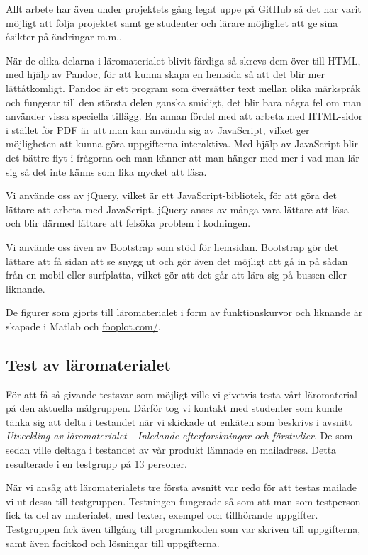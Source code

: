 \documentclass[]{article}
\begin{document}
Allt arbete har även under projektets gång legat uppe på GitHub så det har varit möjligt att följa projektet samt ge 
studenter och lärare möjlighet att ge sina åsikter på ändringar m.m..

När de olika delarna i läromaterialet blivit färdiga så skrevs dem över till HTML, med hjälp av Pandoc, för att kunna 
skapa en hemsida så att det blir mer lättåtkomligt. Pandoc är ett program som översätter text mellan olika märkspråk och 
fungerar till den största delen ganska smidigt, det blir bara några fel om man använder vissa speciella tillägg. En 
annan fördel med att arbeta med HTML-sidor i stället för PDF är att man kan använda sig av JavaScript, vilket ger 
möjligheten att kunna göra uppgifterna interaktiva. Med hjälp av JavaScript blir det bättre flyt i frågorna och man 
känner att man hänger med mer i vad man lär sig så det inte känns som lika mycket att läsa.


Vi använde oss av jQuery, vilket är ett JavaScript-bibliotek, för att göra det lättare att arbeta med JavaScript. jQuery 
anses av många vara lättare att läsa och blir därmed lättare att felsöka problem i kodningen.

Vi använde oss även av Bootstrap som stöd för hemsidan. Bootstrap gör det lättare att få sidan att se snygg ut och gör 
även det möjligt att gå in på sådan från en mobil eller surfplatta, vilket gör att det går att lära sig på bussen eller 
liknande.

De figurer som gjorts till läromaterialet i form av funktionskurvor och liknande är skapade i  
Matlab och \url{fooplot.com/}.


\subsection{Test av läromaterialet}

För att få så givande testsvar som möjligt ville vi givetvis testa vårt läromaterial på den aktuella målgruppen.  Därför
tog vi kontakt med studenter som kunde tänka sig att delta i testandet när vi skickade ut enkäten som beskrivs i avsnitt
\textit{Utveckling av läromaterialet - Inledande efterforskningar och förstudier}. De som sedan ville deltaga i
testandet av vår produkt lämnade en mailadress. Detta resulterade i en testgrupp på 13 personer.

När vi ansåg att läromaterialets tre första avsnitt var redo för att testas mailade vi ut dessa till testgruppen.
Testningen fungerade så som att man som testperson fick ta del av materialet, med texter, exempel och tillhörande
uppgifter. Testgruppen fick även tillgång till programkoden som var skriven till uppgifterna, samt även facitkod och
lösningar till uppgifterna.
\end{document}
